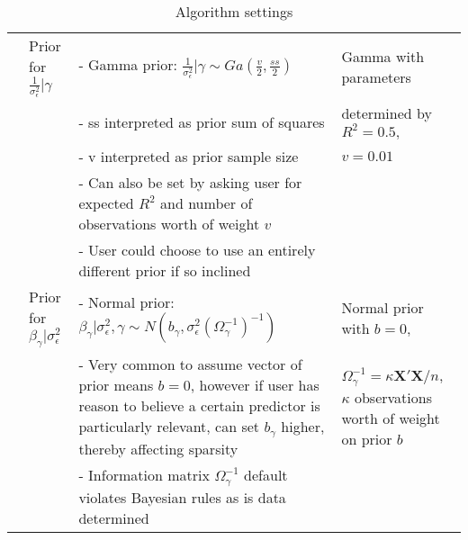 \begin{landscape}
\begin{table}[]
\begin{tabular}{p{2cm} | p{3 cm}| p{11cm}| p{4cm}}
\hline                   & Prior for $\frac{1}{\sigma_{\epsilon}^{2}}| \gamma$ & - Gamma prior: $ \frac{1}{\sigma_{\epsilon}^{2}} | \gamma \sim Ga(\frac{v}{2}, \frac{ss}{2}) $                                                                                            & Gamma with parameters                             \\
                   &                                                    & - ss interpreted as prior sum of squares                                                                                                                                                  &   determined by $R^{2}=0.5,$                                                   \\
                   &                                                    & - v interpreted as prior sample size                                                                                                                                                      &   $v = 0.01$                                                 \\
                   &                                                    & - Can also be set by asking user for expected $R^{2}$ and number of observations worth of weight $v$                                                                                         &                                                    \\
                   &                                                    & - User could choose to use an entirely different prior if so inclined                                                                                                                     &                                                    \\
\hline                   & Prior for $\beta_{\gamma} | \sigma_{\epsilon}^{2}$ & - Normal prior: $\beta_{\gamma} | \sigma_{\epsilon}^{2} , \gamma \sim N(b_{\gamma}, \sigma_{\epsilon}^{2}(\Omega_{\gamma}^{-1})^{-1}) $                                                   & Normal prior with $b = 0$,                                            \\
                   &                                                    & - Very common to assume vector of prior means $b = 0$, however if user has reason to believe a certain predictor is particularly relevant, can set $b_{\gamma}$ higher, thereby affecting sparsity & $\Omega_{\gamma}^{-1} = \kappa \mathbf{X'X}/n$, $\kappa$ observations worth of weight on prior $b$     \\
                   &                                                    & - Information matrix $\Omega_{\gamma}^{-1}$ default violates Bayesian rules as is data determined                                                                                         &  \\
\end{tabular}
\caption{Algorithm settings}
\label{tab:algsettings}
\end{table}
\end{landscape}

